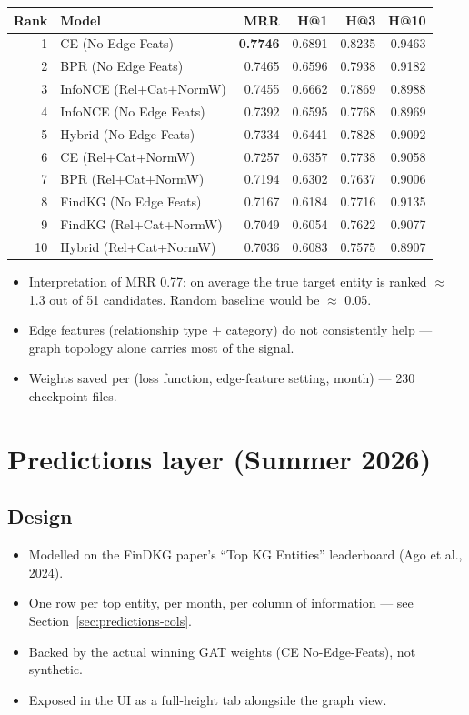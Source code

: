 \documentclass[11pt]{article}
\begin{document}
\begin{center}
\begin{tabular}{rlrrrr}
\toprule
\textbf{Rank} & \textbf{Model} & \textbf{MRR} & \textbf{H@1} & \textbf{H@3} & \textbf{H@10} \\
\midrule
1  & CE (No Edge Feats)       & \textbf{0.7746} & 0.6891 & 0.8235 & 0.9463 \\
2  & BPR (No Edge Feats)      & 0.7465 & 0.6596 & 0.7938 & 0.9182 \\
3  & InfoNCE (Rel+Cat+NormW)  & 0.7455 & 0.6662 & 0.7869 & 0.8988 \\
4  & InfoNCE (No Edge Feats)  & 0.7392 & 0.6595 & 0.7768 & 0.8969 \\
5  & Hybrid (No Edge Feats)   & 0.7334 & 0.6441 & 0.7828 & 0.9092 \\
6  & CE (Rel+Cat+NormW)       & 0.7257 & 0.6357 & 0.7738 & 0.9058 \\
7  & BPR (Rel+Cat+NormW)      & 0.7194 & 0.6302 & 0.7637 & 0.9006 \\
8  & FindKG (No Edge Feats)   & 0.7167 & 0.6184 & 0.7716 & 0.9135 \\
9  & FindKG (Rel+Cat+NormW)   & 0.7049 & 0.6054 & 0.7622 & 0.9077 \\
10 & Hybrid (Rel+Cat+NormW)   & 0.7036 & 0.6083 & 0.7575 & 0.8907 \\
\bottomrule
\end{tabular}
\end{center}

\begin{itemize}
  \item Interpretation of MRR 0.77: on average the true target entity is ranked \(\approx\) 1.3 out of 51 candidates. Random baseline would be \(\approx\) 0.05.
  \item Edge features (relationship type + category) do not consistently help --- graph topology alone carries most of the signal.
  \item Weights saved per (loss function, edge-feature setting, month) --- 230 checkpoint files.
\end{itemize}

\section{Predictions layer (Summer 2026)}
\label{sec:predictions}

\subsection{Design}
\begin{itemize}
  \item Modelled on the FinDKG paper's ``Top KG Entities'' leaderboard (Ago et al., 2024).
  \item One row per top entity, per month, per column of information --- see Section~\ref{sec:predictions-cols}.
  \item Backed by the actual winning GAT weights (CE No-Edge-Feats), not synthetic.
  \item Exposed in the UI as a full-height tab alongside the graph view.
\end{itemize}
\end{document}
